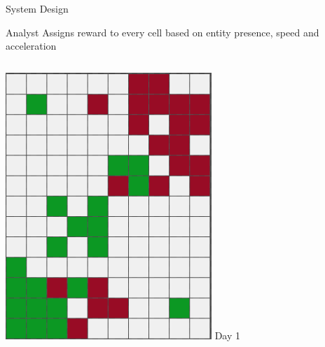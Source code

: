 \documentclass[9pt]{beamer}
\begin{document}
\begin{frame}{System Design}
    \begin{block}{Analyst}
        Assigns reward to every cell based on entity presence, speed and acceleration
    \end{block}
    \begin{columns}
        \begin{column}{0.33\textwidth}
            \begin{columns}
                \begin{column}{0.5\textwidth}
                    \begin{center}
                        \includegraphics[width=\textwidth,trim={0cm 0cm 0cm 0cm},clip]{img/analyst1.png}
                        \newline
                        Day 1
                        \newline

\end{center}
\end{column}
\end{columns}
\end{column}
\end{columns}
\end{frame}
\end{document}
